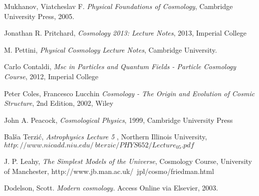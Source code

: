 \documentclass[12pt]{article} %
\begin{document}
\begin{thebibliography}{99} %

   Mukhanov, Viatcheslav F. {\em Physical Foundations of Cosmology}, Cambridge University Press, 2005.
  
   Jonathan R. Pritchard, {\em Cosmology 2013: Lecture Notes}, 2013, Imperial College
  
     M. Pettini, {\em Physical Cosmology Lecture Notes}, Cambridge University.
    
            Carlo Contaldi, {\em Msc in Particles and Quantum Fields -
           Particle Cosmology Course}, 2012, Imperial College
    
        Peter Coles, Francesco Lucchin {\em Cosmology - The Origin and Evolution of Cosmic Structure}, 2nd Edition, 2002, Wiley
      


   John A. Peacock, {\em Cosmological Physics}, 1999, Cambridge University Press


   Balša Terzić, {\em Astrophysics Lecture 5 }, Northern Illinois University, $http://www.nicadd.niu.edu/~bterzic/PHYS652/Lecture_05.pdf$

  
  
  
  
   J. P. Leahy, {\em The Simplest Models of the Universe}, Cosmology Course, University of Manchester, http://www.jb.man.ac.uk/~jpl/cosmo/friedman.html
  
  
  
   Dodelson, Scott. {\em Modern cosmology.} Access Online via Elsevier, 2003.
  

  

  
  

  \end{thebibliography}
  
\end{document}
